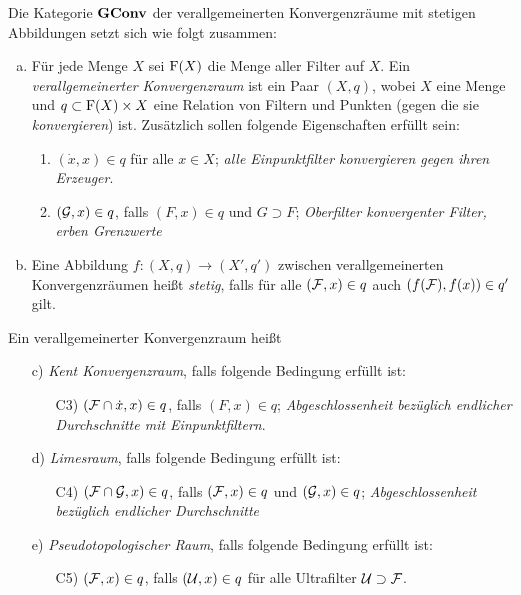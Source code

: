 \begin{defn}
  Die Kategorie $\mathbf{GConv}$ der verallgemeinerten Konvergenzräume mit stetigen Abbildungen setzt sich wie folgt zusammen:
  \begin{enumerate}[a)]
    \item Für jede Menge $X$ sei $\mathrm{F}(X)$ die Menge aller Filter auf $X$. 
      Ein \emph{verallgemeinerter Konvergenzraum} ist ein Paar $(X,q)$, wobei $X$ eine Menge und $q \subset \mathrm{F}(X) \times X$ eine Relation von Filtern und Punkten (gegen die sie \emph{konvergieren}) ist. 
      Zusätzlich sollen folgende Eigenschaften erfüllt sein:
      \begin{enumerate}[C1)]
        \item $(\dot x, x) \in q$ für alle $x \in X$; \emph{alle Einpunktfilter konvergieren gegen ihren Erzeuger}.
        \item $(\mathcal{G}, x) \in q$, falls $(F,x) \in q$ und $G \supset F$; \emph{Oberfilter konvergenter Filter, erben Grenzwerte}
      \end{enumerate}
    \item Eine Abbildung $f \colon (X,q) \to (X',q')$ zwischen verallgemeinerten Konvergenzräumen heißt \emph{stetig}, falls für alle $(\mathcal{F},x) \in q$ auch $(f(\mathcal{F}), f(x)) \in q'$ gilt.
  \end{enumerate}
  Ein verallgemeinerter Konvergenzraum heißt
  \begin{enumerate}[a)]
    \item[c)] \emph{Kent Konvergenzraum}, falls folgende Bedingung erfüllt ist:
      \begin{enumerate}
        \item[C3)] $(\mathcal{F} \cap \dot x, x) \in q$, falls $(F, x) \in q$; \emph{Abgeschlossenheit bezüglich endlicher Durchschnitte mit Einpunktfiltern}.
      \end{enumerate}
    \item[d)] \emph{Limesraum}, falls folgende Bedingung erfüllt ist:
      \begin{enumerate}
        \item[C4)] $(\mathcal{F} \cap \mathcal{G}, x) \in q$, falls $(\mathcal{F},x) \in q$ und $(\mathcal{G},x) \in q$; \emph{Abgeschlossenheit bezüglich endlicher Durchschnitte}
      \end{enumerate}
    \item[e)] \emph{Pseudotopologischer Raum}, falls folgende Bedingung erfüllt ist:
      \begin{enumerate}
        \item[C5)] $(\mathcal{F},x) \in q$, falls $(\mathcal{U}, x) \in q$ für alle Ultrafilter $\mathcal{U} \supset \mathcal{F}$.

\end{enumerate}
\end{enumerate}
\end{defn}
